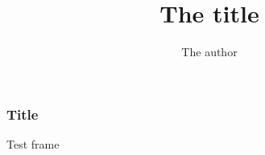 \documentclass{beamer}
\title{The title}
\author{The author}
\begin{document}
\begin{frame}
\frametitle{Title}
Test frame
\end{frame}
\end{document}
